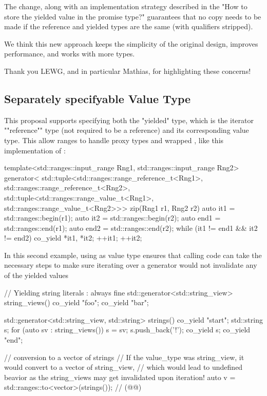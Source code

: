 \documentclass{wg21}
\begin{document}
The change, along with an implementation strategy described in the "How to store the yielded value in the promise type?" guarantees that
no copy needs to be made if the reference and yielded types are the same (with qualifiers stripped).

We think this new approach keeps the simplicity of the original design, improves performance, and works with more types.

Thank you LEWG, and in particular Mathias, for highlighting these concerns!

\subsection{Separately specifyable Value Type}

This proposal supports specifying both the "yielded" type, which is the iterator ""reference"" type (not required to be a reference) and its corresponding value type.
This allow ranges to handle proxy types and wrapped , like this implementation of :

\begin{colorblock}
    template<std::ranges::input_range Rng1, std::ranges::input_range Rng2>
    generator<
        std::tuple<std::ranges::range_reference_t<Rng1>, std::ranges::range_reference_t<Rng2>,
        std::tuple<std::ranges::range_value_t<Rng1>, std::ranges::range_value_t<Rng2>>>
    zip(Rng1 r1, Rng2 r2) {
        auto it1 = std::ranges::begin(r1);
        auto it2 = std::ranges::begin(r2);
        auto end1 = std::ranges::end(r1);
        auto end2 = std::ranges::end(r2);
        while (it1 != end1 && it2 != end2) {
            co_yield {*it1, *it2};
            ++it1; ++it2;
        }
    }
\end{colorblock}

In this second example, using  as value type ensures that calling code can take the necessary steps
to make sure iterating over a generator would not invalidate any of the yielded values

\begin{colorblock}

// Yielding string literals : always fine
std::generator<std::string_view> string_views() {
    co_yield "foo";
    co_yield "bar";
}

std::generator<std::string_view, std::string> strings() {
    co_yield "start";
    std::string s;
    for (auto sv : string_views()) {
        s = sv;
        s.push_back('!');
        co_yield s;
    }
    co_yield "end";
}

// conversion to a vector of strings
// If the value_type was string_view, it would convert to a vector of string_view,
// which would lead to undefined beavior as the string_views may get invalidated upon iteration!
auto v = std::ranges::to<vector>(strings()); // (@{}@)

\end{colorblock}
\end{document}
